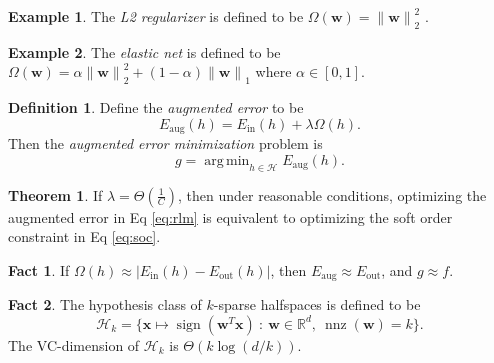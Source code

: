 \documentclass[10pt]{exam}
\theoremstyle{definition}
\newtheorem{example}{Example}
\newtheorem{defn}{Definition}
\newtheorem{fact}{Fact}
\newtheorem{theorem}{Theorem}
\newcommand{\R}{\mathbb R}
\DeclareMathOperator{\nnz}{nnz}
\DeclareMathOperator{\sign}{sign}
\DeclareMathOperator*{\argmin}{arg\,min}
\newcommand{\Ein}{E_{\text{in}}}
\newcommand{\Eout}{E_{\text{out}}}
\newcommand{\Eaug}{E_{\text{aug}}}
\newcommand{\trans}[1]{{#1}^{T}}
\newcommand{\w}{\mathbf w}
\newcommand{\x}{\mathbf x}
\newcommand{\lone}[1]{{\lVert {#1} \rVert}_1}
\newcommand{\ltwo}[1]{{\lVert {#1} \rVert}_2}
\begin{document}
\begin{example}
    The \emph{L2 regularizer} is defined to be
    $
        \Omega(\w) = \ltwo{\w}^2
        $
        .
\end{example}

\begin{example}
    The \emph{elastic net} is defined to be
    $
        \Omega(\w) = \alpha \ltwo{\w}^2 + (1-\alpha) \lone{\w}
        $
    where $\alpha \in [0,1]$.
\end{example}


\newpage
\begin{defn}
Define the \emph{augmented error} to be
\begin{equation}
    \Eaug(h) = \Ein(h) + \lambda\Omega(h)
    .
\end{equation}
    Then the \emph{augmented error minimization} problem is
\begin{equation}
    \label{eq:rlm}
    g = \argmin_{h\in\mathcal H} \Eaug(h)
    .
\end{equation}
\end{defn}

\begin{theorem}
    If $\lambda = \Theta(\tfrac 1C)$, then under reasonable conditions, optimizing the augmented error in Eq \eqref{eq:rlm} is equivalent to optimizing the soft order constraint in Eq \eqref{eq:soc}.
\end{theorem}

\begin{fact}
    If $\Omega(h) \approx |\Ein(h) - \Eout(h)|$,
    then $\Eaug \approx \Eout$,
    and $g\approx f$.
\end{fact}

\newpage
\vspace{0.2in}
\begin{fact}
    The hypothesis class of $k$-sparse halfspaces is defined to be
    \begin{equation}
        \mathcal{H}_k = \bigg\{ \x \mapsto \sign(\trans\w\x) ~:~ \w\in\R^d,~\nnz(\w)=k \bigg\}
        .
    \end{equation}
    The VC-dimension of $\mathcal{H}_k$ is $\Theta(k\log (d/k))$.
\end{fact}
\end{document}
